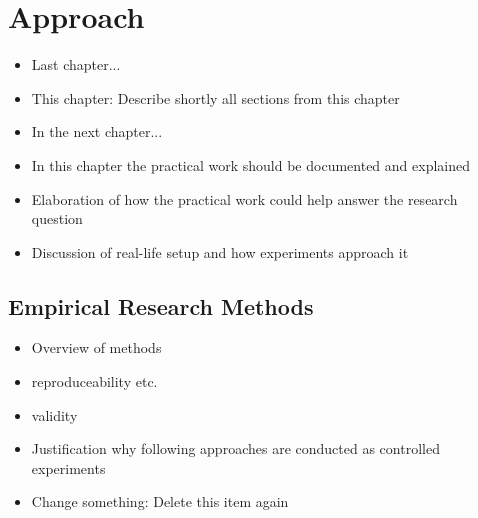 \chapter{Approach}
\label{chapter:approach}

\begin{itemize}
	\item Last chapter...
	\item This chapter: Describe shortly all sections from this chapter
	\item In the next chapter...
\end{itemize}

\begin{itemize}
\item In this chapter the practical work should be documented and explained
\item Elaboration of how the practical work could help answer the research question
\item Discussion of real-life setup and how experiments approach it
\end{itemize}







\section{Empirical Research Methods}


\begin{itemize}
\item Overview of methods
\item reproduceability etc.
\item validity
\item Justification why following approaches are conducted as controlled experiments
\item Change something: Delete this item again
\end{itemize}







